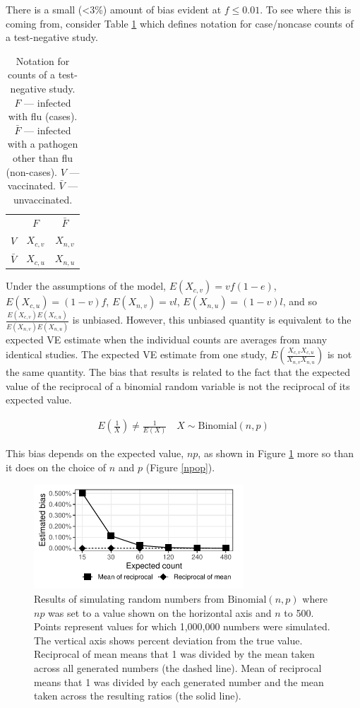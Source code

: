 \documentclass[12pt]{article}
\begin{document}
There is a small (<3\%) amount of bias evident at $f \leq 0.01$. To see where this is coming from, consider Table \ref{GeneralTN} which defines notation for case/noncase counts of a test-negative study. 

\pagebreak

\begin{table}[htp]
\centering
\caption{
	Notation for counts of a test-negative study. $F$ --- infected with flu (cases). $\bar{F}$ --- infected with a pathogen other than flu (non-cases). $V$ --- vaccinated. $\bar{V}$ --- unvaccinated.
	\label{GeneralTN}
}
\begin{tabular}{ccc}
	\toprule
	& $F$ & $\bar{F}$ \\
	$V$ & $X_{c,v}$ & $X_{n,v}$ \\
	$\bar{V}$ & $X_{c,u}$ & $X_{n,u}$ \\
	\bottomrule
\end{tabular}
\end{table}

Under the assumptions of the model, $E(X_{c,v})=vf(1-e)$, $E(X_{c,u})=(1-v)f$, $E(X_{n,v})=vl$, $E(X_{n,u})=(1-v)l$, and so $\frac{E(X_{c,v})E(X_{c,u})}{E(X_{n,v})E(X_{n,u})}$ is unbiased. However, this unbiased quantity is equivalent to the expected VE estimate when the individual counts are averages from many identical studies. The expected VE estimate from one study, $E(\frac{X_{c,v}X_{c,u}}{X_{n,v}X_{n,u}})$ is not the same quantity. The bias that results is related to the fact that the expected value of the reciprocal of a binomial random variable is not the reciprocal of its expected value.

\begin{align}
E(\frac{1}{X}) \neq \frac{1}{E(X)} \quad X \sim \text{Binomial}(n, p)
\end{align}

This bias depends on the expected value, $np$, as shown in Figure \ref{np} more so than it does on the choice of $n$ and $p$ (Figure \ref{npop}).

\begin{figure}[htp]
	\centering
	\includegraphics[width=0.7\textwidth]{../binomial-reciprocal/np.pdf}
	\caption{
	Results of simulating random numbers from $\text{Binomial}(n, p)$ where $np$ was set to a value shown on the horizontal axis and $n$ to 500. Points represent values for which 1,000,000 numbers were simulated. The vertical axis shows percent deviation from the true value. Reciprocal of mean means that 1 was divided by the mean taken across all generated numbers (the dashed line). Mean of reciprocal means that 1 was divided by each generated number and the mean taken across the resulting ratios (the solid line).
	}
	\label{np}
\end{figure}
\end{document}

